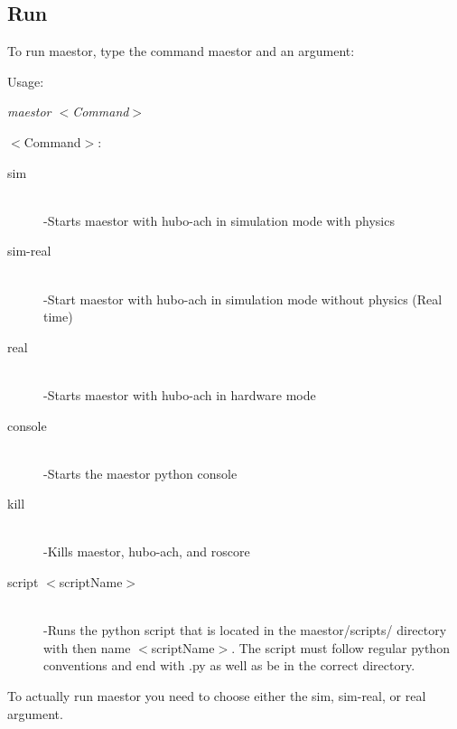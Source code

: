 \documentclass[12pt]{article}
\begin{document}
\subsection{Run}

To run maestor, type the command maestor and an argument:

Usage:
\begin{center}
	\textit{maestor $<$Command$>$} 
\end{center}
$<$Command$>$:
	\begin{description}
		\item[sim] \hfill \\
		-Starts maestor with hubo-ach in simulation mode with physics
		\item[sim-real] \hfill \\
		-Start maestor with hubo-ach in simulation mode without physics (Real time)
		\item[real] \hfill \\
		-Starts maestor with hubo-ach in hardware mode
		\item[console] \hfill \\ 
		-Starts the maestor python console
		\item[kill] \hfill \\
		-Kills maestor, hubo-ach, and roscore
		\item[script $<$scriptName$>$] \hfill \\
		-Runs the python script that is located in the maestor/scripts/ directory with then name $<$scriptName$>$. The script must follow regular python conventions and end with .py as well as be in the correct directory.
	\end{description}

\noindent To actually run maestor you need to choose either the sim, sim-real, or real argument.\\
\end{document}
